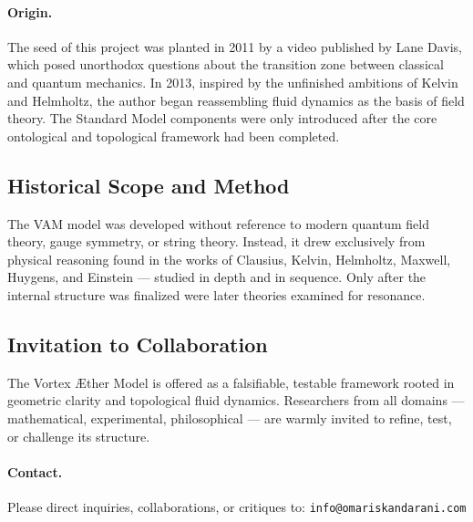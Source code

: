 \documentclass[12pt]{article}
\begin{document}
            \paragraph{Origin.} The seed of this project was planted in 2011 by a video published by Lane Davis, which posed unorthodox questions about the transition zone between classical and quantum mechanics. In 2013, inspired by the unfinished ambitions of Kelvin and Helmholtz, the author began reassembling fluid dynamics as the basis of field theory. The Standard Model components were only introduced after the core ontological and topological framework had been completed.
        
            \subsection*{Historical Scope and Method}
            The VAM model was developed without reference to modern quantum field theory, gauge symmetry, or string theory. Instead, it drew exclusively from physical reasoning found in the works of Clausius, Kelvin, Helmholtz, Maxwell, Huygens, and Einstein — studied in depth and in sequence. Only after the internal structure was finalized were later theories examined for resonance.
        
            \subsection*{Invitation to Collaboration}
            The Vortex \AE{}ther Model is offered as a falsifiable, testable framework rooted in geometric clarity and topological fluid dynamics. Researchers from all domains — mathematical, experimental, philosophical — are warmly invited to refine, test, or challenge its structure.
        
            \paragraph{Contact.} Please direct inquiries, collaborations, or critiques to: \texttt{info@omariskandarani.com}
    
    
    
\end{document}
